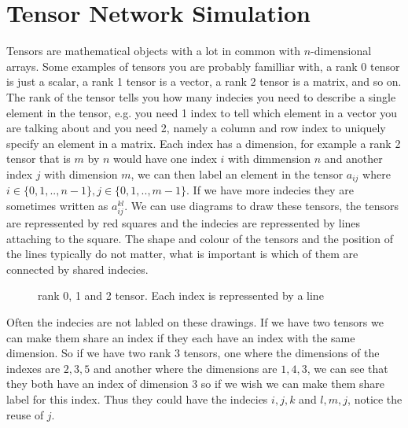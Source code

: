 \section{Tensor Network Simulation}\label{sec:tensor}
Tensors are mathematical objects with a lot in common with $n$-dimensional arrays. Some examples of tensors you are probably familliar with, a rank 0 tensor is just a scalar, a rank 1 tensor is a vector, a rank 2 tensor is a matrix, and so on. The rank of the tensor tells you how many indecies you need to describe a single element in the tensor, e.g. you need 1 index to tell which element in a vector you are talking about and you need 2, namely a column and row index to uniquely specify an element in a matrix. 
Each index has a dimension, for example a rank 2 tensor that is $m$ by $n$ would have one index $i$ with dimmension $n$ and another index $j$ with dimension $m$, we can then label an element in the tensor $a_{ij}$ where $i\in \{0,1,..,n-1\}, j\in \{0,1,..,m-1\}$. If we have more indecies they are sometimes written as $a_{ij}^{kl}$.
We can use diagrams to draw these tensors, the tensors are repressented by red squares and the indecies are repressented by lines attaching to the square. The shape and colour of the tensors and the position of the lines typically do not matter, what is important is which of them are connected by shared indecies. 

\begin{figure}[H]
    \centering 
    \caption{rank 0, 1 and 2 tensor. Each index is repressented by a line}
    \label{fig:r2t}
\end{figure}

\noindent
Often the indecies are not labled on these drawings. If we have two tensors we can make them share an index if they each have an index with the same dimension. So if we have two rank 3 tensors, one where the dimensions of the indexes are $2, 3, 5$ and another where the dimensions are $1, 4, 3$, we can see that they both have an index of dimension 3 so if we wish we can make them share label for this index. Thus they could have the indecies $i, j, k$ and $l, m, j$, notice the reuse of $j$. 

